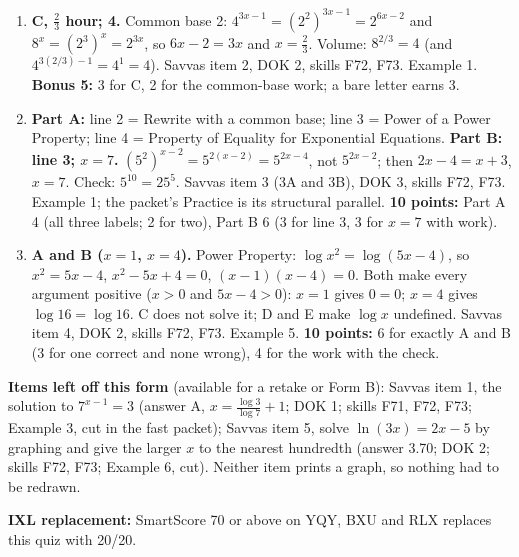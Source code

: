 \documentclass[11pt]{article}
\begin{document}
\begin{enumerate}[label=\textbf{Q\arabic*.}, start=2]
\item \textbf{C, $\tfrac23$ hour; 4.} Common base 2: $4^{3x-1}=(2^2)^{3x-1}=2^{6x-2}$ and $8^x=(2^3)^x=2^{3x}$, so $6x-2=3x$ and $x=\tfrac23$. Volume: $8^{2/3}=4$ (and $4^{3(2/3)-1}=4^1=4$). Savvas item 2, DOK 2, skills F72, F73. Example 1. \textbf{Bonus 5:} 3 for C, 2 for the common-base work; a bare letter earns 3.
\item \textbf{Part A:} line 2 = Rewrite with a common base; line 3 = Power of a Power Property; line 4 = Property of Equality for Exponential Equations. \textbf{Part B: line 3; $x=7$.} $\left(5^2\right)^{x-2}=5^{2(x-2)}=5^{2x-4}$, not $5^{2x-2}$; then $2x-4=x+3$, $x=7$. Check: $5^{10}=25^{5}$. Savvas item 3 (3A and 3B), DOK 3, skills F72, F73. Example 1; the packet's Practice is its structural parallel. \textbf{10 points:} Part A 4 (all three labels; 2 for two), Part B 6 (3 for line 3, 3 for $x=7$ with work).
\item \textbf{A and B ($x=1$, $x=4$).} Power Property: $\log x^2=\log(5x-4)$, so $x^2=5x-4$, $x^2-5x+4=0$, $(x-1)(x-4)=0$. Both make every argument positive ($x>0$ and $5x-4>0$): $x=1$ gives $0=0$; $x=4$ gives $\log16=\log16$. C does not solve it; D and E make $\log x$ undefined. Savvas item 4, DOK 2, skills F72, F73. Example 5. \textbf{10 points:} 6 for exactly A and B (3 for one correct and none wrong), 4 for the work with the check.
\end{enumerate}

\textbf{Items left off this form} (available for a retake or Form B): Savvas item 1, the solution to $7^{x-1}=3$ (answer A, $x=\frac{\log3}{\log7}+1$; DOK 1; skills F71, F72, F73; Example 3, cut in the fast packet); Savvas item 5, solve $\ln(3x)=2x-5$ by graphing and give the larger $x$ to the nearest hundredth (answer 3.70; DOK 2; skills F72, F73; Example 6, cut). Neither item prints a graph, so nothing had to be redrawn.

\textbf{IXL replacement:} SmartScore 70 or above on YQY, BXU and RLX replaces this quiz with 20/20.
\end{document}
